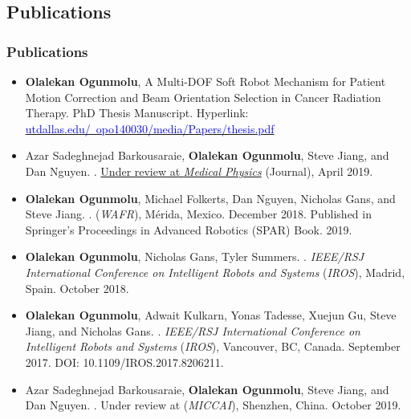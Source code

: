 
\subsection{Publications}
\begin{frame}
	\frametitle{Publications}
	 	\begin{itemize}
	 		\tiny \item \textbf{Olalekan Ogunmolu}, A Multi-DOF Soft Robot Mechanism for Patient Motion Correction and Beam Orientation Selection	in Cancer Radiation Therapy. PhD Thesis Manuscript. Hyperlink: \href{https://ecs.utdallas.edu/~opo140030/media/Papers/thesis.pdf}{\textcolor{blue}{utdallas.edu/~opo140030/media/Papers/thesis.pdf}}
	 		\vspace{0.5em}
	 		\tiny \item Azar Sadeghnejad Barkousaraie, \textbf{Olalekan Ogunmolu}, Steve Jiang, and Dan Nguyen.  \href{}{}. \href{}{Under review at \emph{Medical Physics}} (Journal), April 2019.
	 		\vspace{0.5em}
	 		\tiny \item \textbf{Olalekan Ogunmolu}, Michael Folkerts, Dan Nguyen, Nicholas Gans, and Steve Jiang.  \href{}{}. \textit{} (\emph{WAFR}), Mérida, Mexico. December 2018. Published in Springer's Proceedings in Advanced Robotics (SPAR) Book. 2019.
	 		\vspace{0.5em}
	 		\tiny \item \textbf{Olalekan Ogunmolu}, Nicholas Gans, Tyler Summers. \href{}{}. \textit{IEEE/RSJ International Conference on Intelligent Robots and Systems} (\emph{IROS}), Madrid, Spain. October 2018.
	 		\vspace{0.5em}
	 		\tiny \item \textbf{Olalekan Ogunmolu}, Adwait Kulkarn, Yonas Tadesse, Xuejun Gu, Steve Jiang, and Nicholas Gans. \href{https://arxiv.org/abs/1703.03821}{}. \textit{IEEE/RSJ International Conference on Intelligent Robots and Systems} (\emph{IROS}), Vancouver, BC, Canada. September 2017. DOI: 10.1109/IROS.2017.8206211.
	 		\vspace{0.5em}
	 		\tiny \item Azar Sadeghnejad Barkousaraie,  \textbf{Olalekan Ogunmolu}, Steve Jiang, and Dan Nguyen.  \href{}{}. Under review at \textit{} (\emph{MICCAI}), Shenzhen, China. October 2019.
	 	\end{itemize}
\end{frame}

